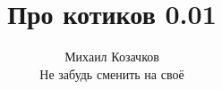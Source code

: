 \documentclass[]{slides}
\begin{document}
\title{Про котиков 0.01}
\author{Михаил Козачков\\Не забудь сменить на своё}
\maketitle
\end{document}
